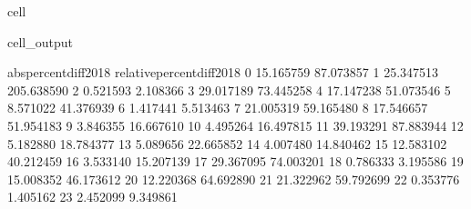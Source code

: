 \documentclass[letterpaper,10pt,english]{jupyterBook}
\begin{document}
\begin{sphinxuseclass}{cell}
\begin{sphinxVerbatimOutput}
\begin{sphinxuseclass}{cell_output}
\begin{sphinxVerbatim}[commandchars=\\\{\}]
    abs\PYGZus{}percent\PYGZus{}diff\PYGZus{}2018  relative\PYGZus{}percent\PYGZus{}diff\PYGZus{}2018  
0               15.165759                  \PYGZhy{}87.073857  
1               25.347513                 \PYGZhy{}205.638590  
2                0.521593                   \PYGZhy{}2.108366  
3               29.017189                   73.445258  
4               17.147238                   51.073546  
5                8.571022                  \PYGZhy{}41.376939  
6                1.417441                    5.513463  
7               21.005319                   59.165480  
8               17.546657                   51.954183  
9                3.846355                  \PYGZhy{}16.667610  
10               4.495264                   16.497815  
11              39.193291                   87.883944  
12               5.182880                   18.784377  
13               5.089656                  \PYGZhy{}22.665852  
14               4.007480                   14.840462  
15              12.583102                   40.212459  
16               3.533140                  \PYGZhy{}15.207139  
17              29.367095                   74.003201  
18               0.786333                   \PYGZhy{}3.195586  
19              15.008352                   46.173612  
20              12.220368                  \PYGZhy{}64.692890  
21              21.322962                   59.792699  
22               0.353776                    1.405162  
23               2.452099                    9.349861  
\end{sphinxVerbatim}

\end{sphinxuseclass}\end{sphinxVerbatimOutput}

\end{sphinxuseclass}
\end{document}
